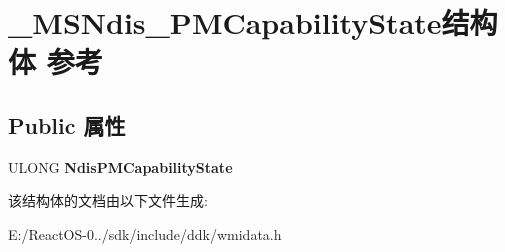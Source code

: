 \hypertarget{struct___m_s_ndis___p_m_capability_state}{}\section{\+\_\+\+M\+S\+Ndis\+\_\+\+P\+M\+Capability\+State结构体 参考}
\label{struct___m_s_ndis___p_m_capability_state}
\subsection*{Public 属性}
\begin{DoxyCompactItemize}
\item 
\mbox{\label{struct___m_s_ndis___p_m_capability_state_af96a31e11db86e442a762439e8036adf}} 
U\+L\+O\+NG {\bfseries Ndis\+P\+M\+Capability\+State}
\end{DoxyCompactItemize}


该结构体的文档由以下文件生成\+:\begin{DoxyCompactItemize}
\item 
E\+:/\+React\+O\+S-\/0../sdk/include/ddk/wmidata.\+h\end{DoxyCompactItemize}
